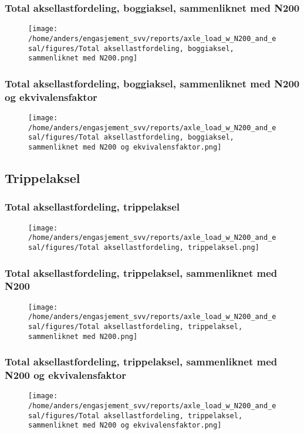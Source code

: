 \documentclass{article}
\begin{document}
\subsubsection{Total aksellastfordeling, boggiaksel, sammenliknet med N200}
\begin{figure}[H]
\centering
\texttt{[image: /home/anders/engasjement\_svv/reports/axle\_load\_w\_N200\_and\_esal/figures/Total aksellastfordeling, boggiaksel, sammenliknet med N200.png]}
\end{figure}
\subsubsection{Total aksellastfordeling, boggiaksel, sammenliknet med N200 og ekvivalensfaktor}
\begin{figure}[H]
\centering
\texttt{[image: /home/anders/engasjement\_svv/reports/axle\_load\_w\_N200\_and\_esal/figures/Total aksellastfordeling, boggiaksel, sammenliknet med N200 og ekvivalensfaktor.png]}
\end{figure}
\subsection{Trippelaksel}
\subsubsection{Total aksellastfordeling, trippelaksel}
\begin{figure}[H]
\centering
\texttt{[image: /home/anders/engasjement\_svv/reports/axle\_load\_w\_N200\_and\_esal/figures/Total aksellastfordeling, trippelaksel.png]}
\end{figure}
\subsubsection{Total aksellastfordeling, trippelaksel, sammenliknet med N200}
\begin{figure}[H]
\centering
\texttt{[image: /home/anders/engasjement\_svv/reports/axle\_load\_w\_N200\_and\_esal/figures/Total aksellastfordeling, trippelaksel, sammenliknet med N200.png]}
\end{figure}
\subsubsection{Total aksellastfordeling, trippelaksel, sammenliknet med N200 og ekvivalensfaktor}
\begin{figure}[H]
\centering
\texttt{[image: /home/anders/engasjement\_svv/reports/axle\_load\_w\_N200\_and\_esal/figures/Total aksellastfordeling, trippelaksel, sammenliknet med N200 og ekvivalensfaktor.png]}
\end{figure}
\end{document}
